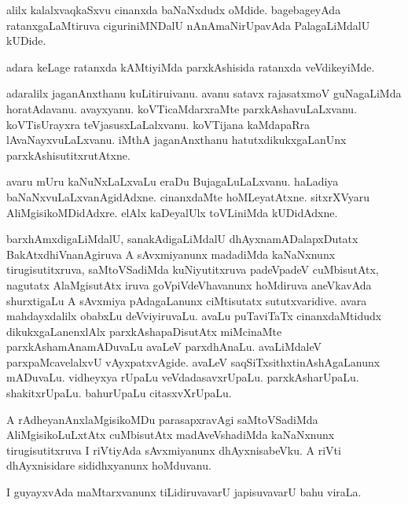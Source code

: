 \documentclass{article}
\begin{document}
\begin{mn}%
alilx kalalxvaqkaSxvu cinanxda baNaNxdudx oMdide. bagebageyAda ratanxgaLaMtiruva 
ciguriniMNDalU nAnAmaNirUpavAda PalagaLiMdalU kUDide.
\end{mn}

\begin{mn}%
adara keLage ratanxda kAMtiyiMda parxkAshisida ratanxda veVdikeyiMde.
\end{mn}

\begin{mn}%
adaralilx jaganAnxthanu kuLitiruivanu. avanu satavx rajasatxmoV guNagaLiMda horatAdavanu. 
avayxyanu. koVTicaMdarxraMte parxkAshavuLaLxvanu. koVTisUrayxra teVjasusxLaLalxvanu. 
koVTijana kaMdapaRra lAvaNayxvuLaLxvanu. iMthA jaganAnxthanu hatutxdikukxgaLanUnx 
parxkAshisutitxrutAtxne.
\end{mn}

\begin{mn}%
avaru mUru kaNuNxLaLxvaLu eraDu BujagaLuLaLxvanu. haLadiya baNaNxvuLaLxvanAgidAdxne. 
cinanxdaMte  hoMLeyatAtxne. sitxrXVyaru AliMgisikoMDidAdxre. elAlx kaDeyalUlx toVLiniMda 
kUDidAdxne.
\end{mn}

\begin{mn}%
barxhAmxdigaLiMdalU, sanakAdigaLiMdalU dhAyxnamADalapxDutatx BakAtxdhiVnanAgiruva A 
sAvxmiyanunx madadiMda kaNaNxnunx tirugisutitxruva, saMtoVSadiMda kuNiyutitxruva 
padeVpadeV cuMbisutAtx, nagutatx AlaMgisutAtx iruva goVpiVdeVhavanunx hoMdiruva 
aneVkavAda shurxtigaLu A sAvxmiya pAdagaLanunx ciMtisutatx sututxvaridive. avara 
mahdayxdalilx obabxLu deVviyiruvaLu. avaLu  puTaviTaTx cinanxdaMtidudx dikukxgaLanenxlAlx 
parxkAshapaDisutAtx miMcinaMte parxkAshamAnamADuvaLu avaLeV parxdhAnaLu. avaLiMdaleV 
parxpaMcavelalxvU vAyxpatxvAgide. avaLeV saqSiTxsithxtinAshAgaLanunx mADuvaLu. vidheyxya 
rUpaLu veVdadasavxrUpaLu. parxkAsharUpaLu. shakitxrUpaLu. bahurUpaLu citasxvXrUpaLu.
\end{mn}

\begin{mn}%
A rAdheyanAnxlaMgisikoMDu parasapxravAgi saMtoVSadiMda AliMgisikoLuLxtAtx cuMbisutAtx 
madAveVshadiMda kaNaNxnunx tirugisutitxruva I riVtiyAda sAvxmiyanunx dhAyxnisabeVku. A 
riVti dhAyxnisidare sididhxyanunx hoMduvanu.
\end{mn}

\begin{mn}%
I guyayxvAda maMtarxvanunx tiLidiruvavarU japisuvavarU bahu viraLa.
\end{mn}
\end{document}
